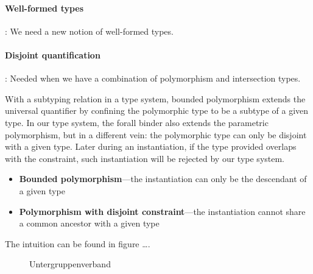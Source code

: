 \documentclass[nocopyrightspace,preprint,times,9pt]{sigplanconf}
\begin{document}
\paragraph{Well-formed types}: We need a new notion of well-formed types.

\paragraph{Disjoint quantification}: Needed when we have a
combination of polymorphism and intersection types.

With a subtyping relation in a type system, bounded polymorphism extends the universal quantifier by confining the polymorphic type to be a subtype of a given type. In our type system, the forall binder also extends the parametric polymorphism, but in a different vein: the polymorphic type can only be disjoint with a given type. Later during an instantiation, if the type provided overlaps with the constraint, such instantiation will be rejected by our type system.

\begin{itemize}
  \item \textbf{Bounded polymorphism}---the instantiation can only be the descendant of a given type
  \item \textbf{Polymorphism with disjoint constraint}---the instantiation cannot share a common ancestor with a given type
\end{itemize}

The intuition can be found in figure \ldots.

\begin{figure}

\centering
\newcommand{\mydistance}{.6cm}
\caption{Untergruppenverband}
\end{figure}
\end{document}
